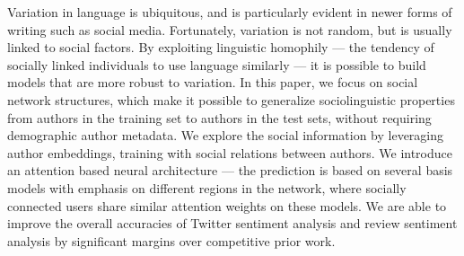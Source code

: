 Variation in language is ubiquitous, and is particularly evident in newer forms of writing such as social media. Fortunately, variation is not random, but is usually linked to social factors. By exploiting linguistic homophily --- the tendency of socially linked individuals to use language similarly --- it is possible to build models that are more robust to variation. In this paper, we focus on social network structures, which make it possible to generalize sociolinguistic properties from authors in the training set to authors in the test sets, without requiring demographic author metadata. We explore the social information by leveraging author embeddings, training with social relations between authors. We introduce an attention based neural architecture --- the prediction is based on several basis models with emphasis on different regions in the network, where socially connected users share similar attention weights on these models. We are able to improve the overall accuracies of Twitter sentiment analysis and review sentiment analysis by significant margins over competitive prior work.